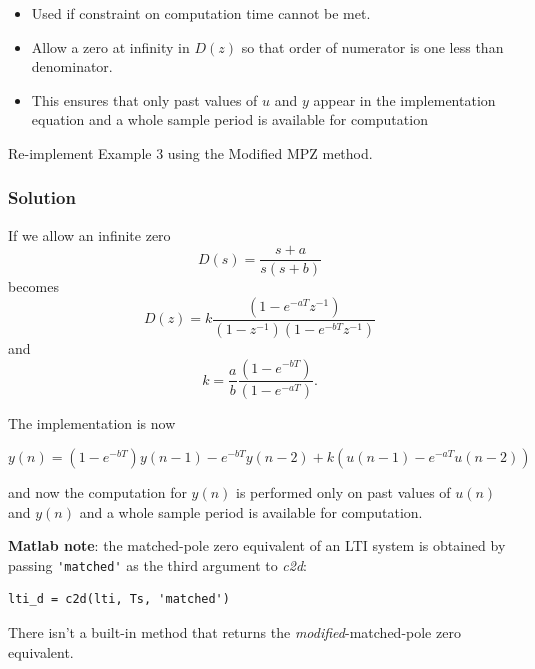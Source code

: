 \begin{slide}\label{slides:l11s26}
	\begin{itemize}
	\item
	Used if constraint on computation time cannot be met.

	\item Allow a zero at infinity in $D(z)$ so that order of numerator is one
  less than denominator.

	\item This ensures that only past values of $u$ and $y$ appear in the implementation
  equation and a whole sample period is available for computation

\end{itemize}
\end{slide}

\begin{slide}

Re-implement Example 3 using the Modified MPZ method.
\end{slide}
\subsubsection*{Solution}
If we allow an infinite zero
$$D(s)=\frac{s+a}{s(s+b)}$$ becomes
$$D(z)=k\frac{(1-e^{-aT}z^{-1})}{(1-z^{-1})(1-e^{-bT}z^{-1})}$$ and
$$k=\frac{a}{b}\frac{(1-e^{-bT})}{(1-e^{-aT})}.$$

The implementation is now

$$y(n) = (1 - e^{-bT})y(n-1)-e^{-bT}y(n-2)+k(u(n-1)-e^{-aT}u(n-2))$$

and now the computation for $y(n)$ is performed only on past values of $u(n)$ and
$y(n)$ and a whole sample period is available for computation.

\textbf{Matlab note}: the matched-pole zero equivalent of an LTI system is obtained by passing \verb|'matched'| as the third argument to \emph{c2d}:
\begin{verbatim}
lti_d = c2d(lti, Ts, 'matched')
\end{verbatim}
There isn't a built-in method that returns the \emph{modified}-matched-pole zero equivalent.


\endinput

